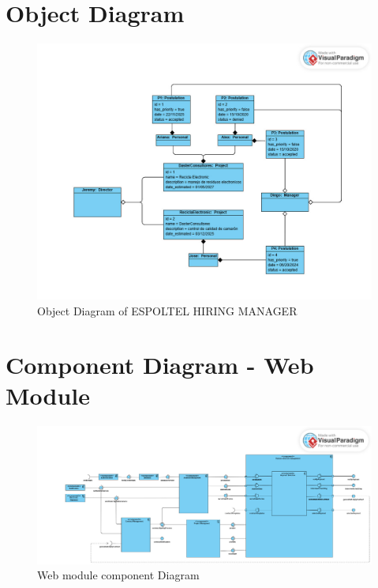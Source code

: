 \documentclass{scrreprt}
\begin{document}
\section{Object Diagram}
 \begin{figure}[H]
	\centering  \small
	\includegraphics[width=\textwidth]{ObjectDiagram.jpeg} 
	\caption{Object Diagram of ESPOLTEL HIRING MANAGER}
	\label{fig:OBJD}
\end{figure}

\section{Component Diagram - Web Module}
 \begin{figure}[H]
	\centering  \small
	\includegraphics[width=\textwidth]{DCP/DCP1.jpeg} 
	\caption{Web module component Diagram}
	\label{fig:DCP1}
\end{figure}
\end{document}
